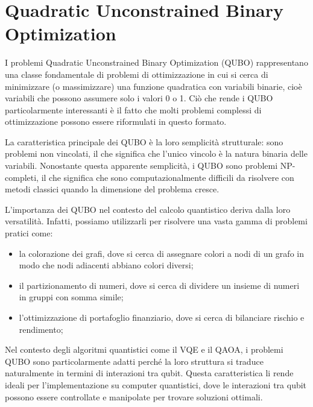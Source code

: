 \section{Quadratic Unconstrained Binary Optimization}\label{sec:algoritmi}

I problemi Quadratic Unconstrained Binary Optimization (QUBO) rappresentano una 
classe fondamentale di problemi di ottimizzazione in cui si cerca di minimizzare 
(o massimizzare) una funzione quadratica con variabili binarie, cioè variabili 
che possono assumere solo i valori 0 o 1. Ciò che rende i QUBO particolarmente 
interessanti è il fatto che molti problemi complessi di ottimizzazione possono 
essere riformulati in questo formato.

La caratteristica principale dei QUBO è la loro semplicità strutturale: sono 
problemi non vincolati, il che significa che l'unico vincolo è la natura binaria 
delle variabili. Nonostante questa apparente semplicità, i QUBO sono problemi 
NP-completi, il che significa che sono computazionalmente difficili da risolvere 
con metodi classici quando la dimensione del problema cresce.

L'importanza dei QUBO nel contesto del calcolo quantistico deriva dalla loro 
versatilità. Infatti, possiamo utilizzarli per risolvere una vasta gamma di 
problemi pratici come:

\begin{itemize}
    \item la colorazione dei grafi, dove si cerca di assegnare colori a nodi di 
        un grafo in modo che nodi adiacenti abbiano colori diversi;
    \item il partizionamento di numeri, dove si cerca di dividere un insieme di 
        numeri in gruppi con somma simile;
    \item l'ottimizzazione di portafoglio finanziario, dove si cerca di bilanciare 
        rischio e rendimento;
\end{itemize}

Nel contesto degli algoritmi quantistici come il VQE e il QAOA, i problemi QUBO sono 
particolarmente adatti perché la loro struttura si traduce naturalmente in termini 
di interazioni tra qubit. Questa caratteristica li rende ideali per 
l'implementazione su computer quantistici, dove le interazioni tra qubit possono 
essere controllate e manipolate per trovare soluzioni ottimali.

